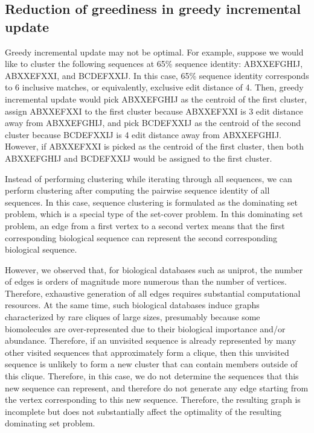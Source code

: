 \documentclass[]{article}
\begin{document}
\iffalse

\subsection{Reduction of greediness in greedy incremental update}

Greedy incremental update may not be optimal. 
For example, suppose we would like to cluster the following sequences at 65\% sequence identity:
ABXXEFGHIJ, 
ABXXEFXXI, and
BCDEFXXIJ.
In this case, 65\% sequence identity corresponds to 6 inclusive matches, or equivalently, exclusive edit distance of 4.
Then, greedy incremental update would pick ABXXEFGHIJ as the centroid of the first cluster, 
assign ABXXEFXXI to the first cluster because ABXXEFXXI is 3 edit distance away from ABXXEFGHIJ, 
and pick BCDEFXXIJ as the centroid of the second cluster because BCDEFXXIJ is 4 edit distance away from ABXXEFGHIJ.
However, if ABXXEFXXI is picked as the centroid of the first cluster, then both ABXXEFGHIJ and BCDEFXXIJ would be assigned to the first cluster. 

Instead of performing clustering while iterating through all sequences, we can perform clustering after computing the pairwise sequence identity of all sequences. 
In this case, sequence clustering is formulated as the dominating set problem, which is a special type of the set-cover problem. 
In this dominating set problem, an edge from a first vertex to a second vertex means that the first corresponding biological sequence can represent the second corresponding biological sequence. 

However, we observed that, for biological databases such as uniprot, the number of edges is orders of magnitude more numerous than the number of vertices. Therefore, exhaustive generation of all edges requires substantial computational resources.
At the same time, such biological databases induce graphs characterized by rare cliques of large sizes, presumably because some biomolecules are over-represented due to their biological importance and/or abundance.
Therefore, if an unvisited sequence is already represented by many other visited sequences that approximately form a clique, then this unvisited sequence is unlikely to form a new cluster that can contain members outside of this clique. 
Therefore, in this case, we do not determine the sequences that this new sequence can represent, and therefore do not generate any edge starting from the vertex corresponding to this new sequence. 
Therefore, the resulting graph is incomplete but does not substantially affect the optimality of the resulting dominating set problem.
\end{document}
